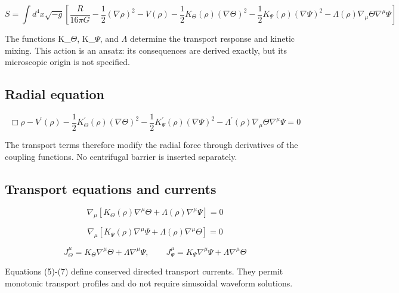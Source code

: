 \documentclass[aps,prd,preprint,nofootinbib,superscriptaddress]{revtex4-2}
\begin{document}
\begin{equation}
S=\int d^4x\sqrt{-g}\left[\frac{R}{16\pi G}-\frac12(\nabla\rho)^2-V(\rho)-\frac12K_\Theta(\rho)(\nabla\Theta)^2-\frac12K_\Psi(\rho)(\nabla\Psi)^2-\Lambda(\rho)\nabla_\mu\Theta\nabla^\mu\Psi\right]
\tag{3}\label{eq:3}
\end{equation}

The functions K\_$\Theta$, K\_$\Psi$, and $\Lambda$ determine the transport response and kinetic mixing. This action is an ansatz: its consequences are derived exactly, but its microscopic origin is not specified.


\subsection{Radial equation}

\begin{equation}
\Box\rho-V^{\prime}(\rho)-\frac12K_\Theta^{\prime}(\rho)(\nabla\Theta)^2-\frac12K_\Psi^{\prime}(\rho)(\nabla\Psi)^2-\Lambda^{\prime}(\rho)\nabla_\mu\Theta\nabla^\mu\Psi=0
\tag{4}\label{eq:4}
\end{equation}

The transport terms therefore modify the radial force through derivatives of the coupling functions. No centrifugal barrier is inserted separately.


\subsection{Transport equations and currents}

\begin{equation}
\nabla_\mu\left[K_\Theta(\rho)\nabla^\mu\Theta+\Lambda(\rho)\nabla^\mu\Psi\right]=0
\tag{5}\label{eq:5}
\end{equation}

\begin{equation}
\nabla_\mu\left[K_\Psi(\rho)\nabla^\mu\Psi+\Lambda(\rho)\nabla^\mu\Theta\right]=0
\tag{6}\label{eq:6}
\end{equation}

\begin{equation}
J_\Theta^\mu=K_\Theta\nabla^\mu\Theta+\Lambda\nabla^\mu\Psi,\qquad J_\Psi^\mu=K_\Psi\nabla^\mu\Psi+\Lambda\nabla^\mu\Theta
\tag{7}\label{eq:7}
\end{equation}

Equations (5)-(7) define conserved directed transport currents. They permit monotonic transport profiles and do not require sinusoidal waveform solutions.
\end{document}
